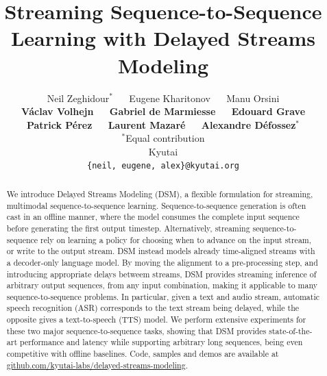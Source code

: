 \documentclass{article}
\title{Streaming Sequence-to-Sequence Learning with Delayed Streams Modeling}
\author{%
  Neil Zeghidour$^{*}$ $\quad$
  Eugene Kharitonov $\quad$
  Manu Orsini \\ 
 \textbf{ V\'aclav Volhejn} $\quad$
  \textbf{Gabriel de Marmiesse} $\quad$
  \textbf{Edouard Grave} \\
  \textbf{Patrick P\'erez} $\quad$
  \textbf{Laurent Mazar\'e} $\quad$ \textbf{Alexandre D\'efossez}$^{*}$ \vspace{1mm} \\
  {$^*$Equal contribution}\\
  Kyutai \\
  \texttt{\{neil, eugene, alex\}@kyutai.org}
}
\begin{document}
\maketitle


\begin{abstract}
We introduce Delayed Streams Modeling (DSM), a flexible formulation for streaming, multimodal sequence-to-sequence learning. Sequence-to-sequence generation is often cast in an offline manner, where the model consumes the complete input sequence before generating the first output timestep. Alternatively, streaming sequence-to-sequence rely on learning a policy for choosing when to advance on the input stream, or write to the output stream. DSM instead models already time-aligned streams with a decoder-only language model. By moving the alignment to a pre-processing step,
and introducing appropriate delays betweem streams, DSM provides streaming inference of arbitrary output sequences, from any input combination, making it applicable to many sequence-to-sequence problems.
In particular, given a text and audio stream, automatic speech recognition (ASR) corresponds to the text stream
    being delayed, while the opposite gives a text-to-speech (TTS) model. We perform extensive experiments for these two major sequence-to-sequence tasks, showing that DSM provides state-of-the-art performance and latency while supporting arbitrary long sequences, being even competitive with offline baselines. Code, samples and demos are available at \href{https://github.com/kyutai-labs/delayed-streams-modeling/}{github.com/kyutai-labs/delayed-streams-modeling}.
    
\end{abstract}
\end{document}

